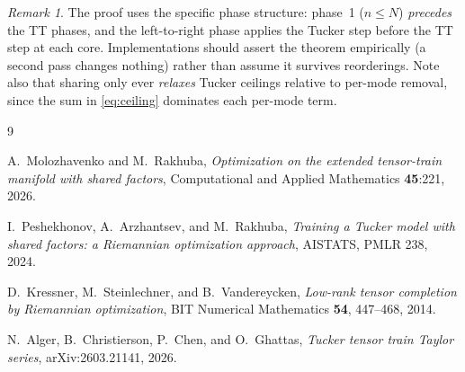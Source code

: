 \documentclass[11pt]{article}
\theoremstyle{definition}
\theoremstyle{remark}
\newtheorem{remark}[theorem]{Remark}
\begin{document}
\begin{remark}
The proof uses the specific phase structure: phase~1 ($n \leq N$)
\emph{precedes} the TT phases, and the left-to-right phase applies the Tucker
step before the TT step at each core. Implementations should assert the
theorem empirically (a second pass changes nothing) rather than assume it
survives reorderings. Note also that sharing only ever \emph{relaxes} Tucker
ceilings relative to per-mode removal, since the sum in \eqref{eq:ceiling}
dominates each per-mode term.
\end{remark}

\begin{thebibliography}{9}

A.~Molozhavenko and M.~Rakhuba,
\emph{Optimization on the extended tensor-train manifold with shared
factors}, Computational and Applied Mathematics \textbf{45}:221, 2026.

I.~Peshekhonov, A.~Arzhantsev, and M.~Rakhuba,
\emph{Training a Tucker model with shared factors: a Riemannian optimization
approach}, AISTATS, PMLR 238, 2024.

D.~Kressner, M.~Steinlechner, and B.~Vandereycken,
\emph{Low-rank tensor completion by Riemannian optimization},
BIT Numerical Mathematics \textbf{54}, 447--468, 2014.

N.~Alger, B.~Christierson, P.~Chen, and O.~Ghattas,
\emph{Tucker tensor train Taylor series}, arXiv:2603.21141, 2026.

\end{thebibliography}
\end{document}
